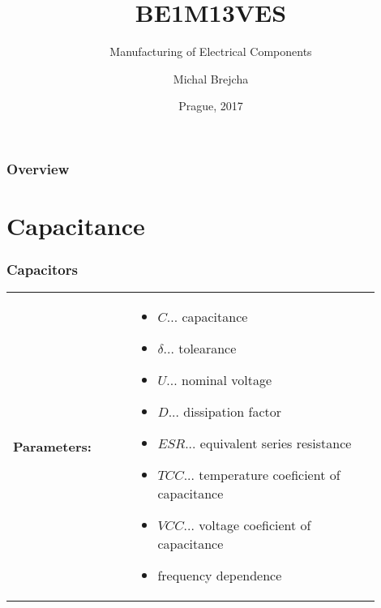\documentclass{beamer}
\title[BE1M13VES]{BE1M13VES}
\subtitle[Manufacturing of Electrical Components] {Manufacturing of Electrical Components}
\author[Brejcha]{Michal Brejcha}
\institute[CTU]{CTU in Prague}
\date[Prague, 2017]{Prague, 2017}
\begin{document}
\frame{\titlepage}

\begin{frame}
\frametitle{Overview} 
\tableofcontents
\end{frame}


\section{\texorpdfstring{Capacitance}{Capacitance}}
	\begin{frame}
    \frametitle{Capacitors}
		\begin{tabular}{p{0.3\linewidth} p{0.6\linewidth}}
		\textbf{Parameters:} &
		\begin{itemize}
			\item $C$... capacitance
			\item $\delta$... tolearance
			\item $U$... nominal voltage
			\item $D$... dissipation factor 
			\item $ESR$... equivalent series resistance
			\item $TCC$... temperature coeficient of capacitance
			\item $VCC$... voltage coeficient of capacitance
			\item frequency dependence
		\end{itemize}
		\end{tabular}
  \end{frame}
\end{document}
